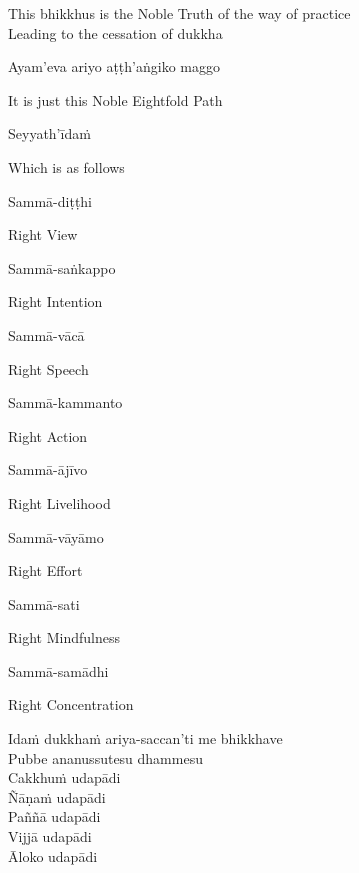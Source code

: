 \begin{english}
  This bhikkhus is the Noble Truth of the way of practice\\
  Leading to the cessation of dukkha
\end{english}

Ayam'eva ariyo aṭṭh'aṅgiko maggo

\begin{english}
  It is just this Noble Eightfold Path
\end{english}

Seyyath'īdaṁ

\begin{english}
  Which is as follows
\end{english}

Sammā-diṭṭhi

\begin{english}
  Right View
\end{english}

Sammā-saṅkappo

\begin{english}
  Right Intention
\end{english}

Sammā-vācā

\begin{english}
  Right Speech
\end{english}

Sammā-kammanto

\begin{english}
  Right Action
\end{english}

Sammā-ājīvo

\begin{english}
  Right Livelihood
\end{english}

Sammā-vāyāmo

\begin{english}
  Right Effort
\end{english}

Sammā-sati

\begin{english}
  Right Mindfulness
\end{english}

Sammā-samādhi

\begin{english}
  Right Concentration
\end{english}

Idaṁ dukkhaṁ ariya-saccan'ti me bhikkhave\\
Pubbe ananussutesu dhammesu\\
Cakkhuṁ udapādi\\
Ñāṇaṁ udapādi\\
Paññā udapādi\\
Vijjā udapādi\\
Āloko udapādi

